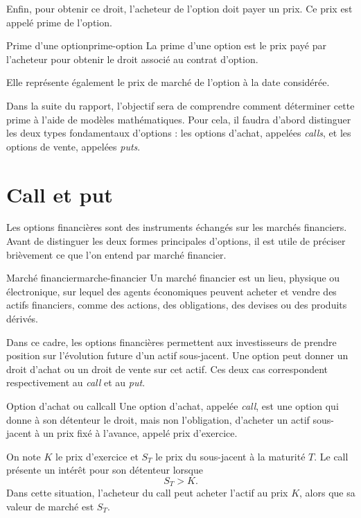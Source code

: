 \documentclass[12pt,a4paper]{report}
\begin{document}
Enfin, pour obtenir ce droit, l'acheteur de l'option doit payer un prix. Ce prix est appelé prime de l'option.

\begin{definition}{Prime d'une option}{prime-option}
La prime d'une option est le prix payé par l'acheteur pour obtenir le droit associé au contrat d'option.

Elle représente également le prix de marché de l'option à la date considérée.
\end{definition}

Dans la suite du rapport, l'objectif sera de comprendre comment déterminer cette prime à l'aide de modèles mathématiques. Pour cela, il faudra d'abord distinguer les deux types fondamentaux d'options : les options d'achat, appelées \textit{calls}, et les options de vente, appelées \textit{puts}.


\section{Call et put}

Les options financières sont des instruments échangés sur les marchés financiers. Avant de distinguer les deux formes principales d'options, il est utile de préciser brièvement ce que l'on entend par marché financier.

\begin{definition}{Marché financier}{marche-financier}
Un marché financier est un lieu, physique ou électronique, sur lequel des agents économiques peuvent acheter et vendre des actifs financiers, comme des actions, des obligations, des devises ou des produits dérivés.
\end{definition}

Dans ce cadre, les options financières permettent aux investisseurs de prendre position sur l'évolution future d'un actif sous-jacent. Une option peut donner un droit d'achat ou un droit de vente sur cet actif. Ces deux cas correspondent respectivement au \textit{call} et au \textit{put}.

\begin{definition}{Option d'achat ou call}{call}
Une option d'achat, appelée \textit{call}, est une option qui donne à son détenteur le droit, mais non l'obligation, d'acheter un actif sous-jacent à un prix fixé à l'avance, appelé prix d'exercice.

On note $K$ le prix d'exercice et $S_T$ le prix du sous-jacent à la maturité $T$. Le call présente un intérêt pour son détenteur lorsque
\[
S_T > K.
\]
Dans cette situation, l'acheteur du call peut acheter l'actif au prix $K$, alors que sa valeur de marché est $S_T$.
\end{definition}
\end{document}
